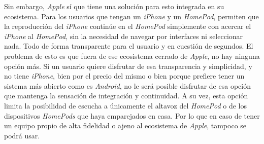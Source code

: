 Sin embargo, \emph{Apple} sí que tiene una solución para esto integrada en su
ecosistema. Para los usuarios que tengan un \emph{iPhone} y un \emph{HomePod},
permiten que la reproducción del \emph{iPhone} continúe en el \emph{HomePod}
simplemente con acercar el \emph{iPhone} al \emph{HomePod}, sin la necesidad de
navegar por interfaces ni seleccionar nada. Todo de forma transparente para el
usuario y en cuestión de segundos. El problema de esto es que fuera de ese
ecosistema cerrado de \emph{Apple}, no hay ninguna opción más. Si un usuario
quiere disfrutar de esa transparencia y simplicidad, y no tiene \emph{iPhone},
bien por el precio del mismo o bien porque prefiere tener un sistema más abierto
como es \emph{Android}, no le será posible disfrutar de esa opción que mantenga
la sensación de integración y continuidad. A su vez, esta opción limita la
posibilidad de escucha a únicamente el altavoz del \emph{HomePod} o de los
dispositivos \emph{HomePods} que haya emparejados en casa. Por lo que en caso de
tener un equipo propio de alta fidelidad o ajeno al ecosistema de \emph{Apple},
tampoco se podrá usar.\\

